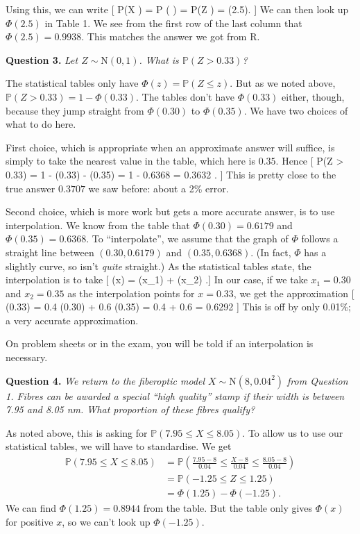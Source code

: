 \documentclass[
  letterpaper,
]{report}
\theoremstyle{definition}
\theoremstyle{definition}
\theoremstyle{remark}
\begin{document}
Using this, we can write {[} \mathbb P(X ) = \mathbb P
\left( \leq {}\right) = \mathbb P(Z
) = \Phi(2.5). {]} We can then look up \(\Phi(2.5)\) in Table 1.
We see from the first row of the last column that
\(\Phi(2.5) = 0.9938\). This matches the answer we got from R.

\textbf{Question 3.} \emph{Let \(Z \sim \mathrm{N}(0,1)\). What is
\(\mathbb P(Z > 0.33)\)?}

The statistical tables only have \(\Phi(z) = \mathbb P(Z \leq z)\). But
as we noted above, \(\mathbb P(Z > 0.33) = 1 - \Phi(0.33)\). The tables
don't have \(\Phi(0.33)\) either, though, because they jump straight
from \(\Phi(0.30)\) to \(\Phi(0.35)\). We have two choices of what to do
here.

First choice, which is appropriate when an approximate answer will
suffice, is simply to take the nearest value in the table, which here is
\(0.35\). Hence {[} \mathbb P(Z \textgreater{} 0.33) = 1 - \Phi(0.33)
 - \Phi(0.35) = 1 - 0.6368 = 0.3632 . {]} This is pretty close
to the true answer \(0.3707\) we saw before: about a 2\% error.

Second choice, which is more work but gets a more accurate answer, is to
use interpolation. We know from the table that \(\Phi(0.30) = 0.6179\)
and \(\Phi(0.35) = 0.6368\). To ``interpolate'', we assume that the
graph of \(\Phi\) follows a straight line between \((0.30, 0.6179)\) and
\((0.35, 0.6368)\). (In fact, \(\Phi\) has a slightly curve, so isn't
\emph{quite} straight.) As the statistical tables state, the
interpolation is to take {[} \Phi(x) = 
\Phi(x\_1) +  \Phi(x\_2) .{]} In our case, if
we take \(x_1 = 0.30\) and \(x_2 = 0.35\) as the interpolation points
for \(x = 0.33\), we get the approximation {[} \Phi(0.33) = 0.4
\Phi(0.30) + 0.6 \Phi(0.35) = 0.4 + 0.6  =
0.6292 {]} This is off by only 0.01\%; a very accurate approximation.

On problem sheets or in the exam, you will be told if an interpolation
is necessary.

\textbf{Question 4.} \emph{We return to the fiberoptic model
\(X \sim \mathrm{N}(8, 0.04^2)\) from Question 1. Fibres can be awarded
a special ``high quality'' stamp if their width is between 7.95 and 8.05
nm. What proportion of these fibres qualify?}

As noted above, this is asking for \(\mathbb P(7.95 \leq X \leq 8.05)\).
To allow us to use our statistical tables, we will have to standardise.
We get \begin{align*}
\mathbb P(7.95 \leq X \leq 8.05)
  &= \mathbb P \left(\frac{7.95 - 8}{0.04} \leq \frac{X - 8}{0.04} \leq \frac{8.05 - 8}{0.04}\right) \\
  &= \mathbb P(-1.25 \leq Z \leq 1.25) \\
  &= \Phi(1.25) - \Phi(-1.25) .
\end{align*} We can find \(\Phi(1.25) = 0.8944\) from the table. But the
table only gives \(\Phi(x)\) for positive \(x\), so we can't look up
\(\Phi(-1.25)\).
\end{document}
